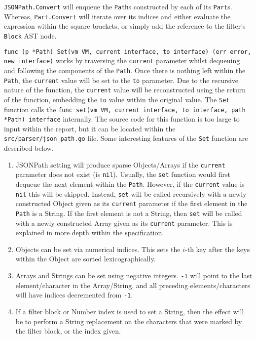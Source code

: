 \inputminted[firstline=529, lastline=581, autogobble, breaklines, tabsize=4]{go}{../../src/parser/json_path.go}

\verb|JSONPath.Convert| will enqueue the \verb|Path|s constructed by each of its \verb|Part|s. Whereas, \verb|Part.Convert| will iterate over its indices and either evaluate the expression within the square brackets, or simply add the reference to the filter's \verb|Block| AST node.

\texttt{func (p *Path) Set(vm VM, current interface{}, to interface{}) (err error, new interface{})} works by traversing the \verb|current| parameter whilst dequeuing and following the components of the \verb|Path|. Once there is nothing left within the \verb|Path|, the \verb|current| value will be set to the \verb|to| parameter. Due to the recursive nature of the function, the \verb|current| value will be reconstructed using the return of the function, embedding the \verb|to| value within the original value. The \verb|Set| function calls the \texttt{func set(vm VM, current interface{}, to interface{}, path *Path) interface{}} internally. The source code for this function is too large to input within the report, but it can be located within the \verb|src/parser/json_path.go| file. Some interesting features of the \verb|Set| function are described below.

\begin{enumerate}
    \item JSONPath setting will produce sparse Objects/Arrays if the \verb|current| parameter does not exist (is \verb|nil|). Usually, the \verb|set| function would first dequeue the next element within the \verb|Path|. However, if the \verb|current| value is \verb|nil| this will be skipped. Instead, \verb|set| will be called recursively with a newly constructed Object given as its \verb|current| parameter if the first element in the \verb|Path| is a String. If the first element is not a String, then \verb|set| will be called with a newly constructed Array given as its \verb|current| parameter. This is explained in more depth within the \hyperref[sec:jsonpath-setting]{specification}.
    \item Objects can be set via numerical indices. This sets the $i$-th key after the keys within the Object are sorted lexicographically.
    \item Arrays and Strings can be set using negative integers. \verb|-1| will point to the last element/character in the Array/String, and all preceding elements/characters will have indices decremented from \verb|-1|.
    \item If a filter block or Number index is used to set a String, then the effect will be to perform a String replacement on the characters that were marked by the filter block, or the index given.
\end{enumerate}

